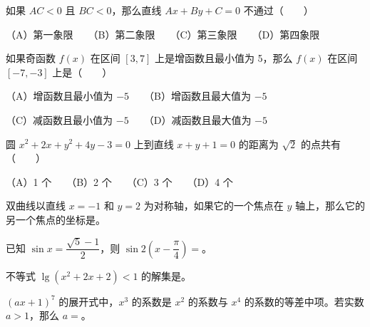 \begin{question}

如果 $AC<0$ 且 $BC<0$，那么直线 $Ax+By+C=0$ 不通过\mbox{（　　）}

（A）第一象限　　（B）第二象限　　（C）第三象限　　（D）第四象限

\end{question}
\begin{question}

如果奇函数 $f(x)$ 在区间 $[3,7]$ 上是增函数且最小值为 5，那么 $f(x)$ 在区间 $[-7,-3]$ 上是\mbox{（　　）}

（A）增函数且最小值为 $-5$　　（B）增函数且最大值为 $-5$

（C）减函数且最小值为 $-5$　　（D）减函数且最大值为 $-5$

\end{question}
\begin{question}

圆 $x^2+2x+y^2+4y-3=0$ 上到直线 $x+y+1=0$ 的距离为 $\sqrt2$ 的点共有\mbox{（　　）}

（A）1 个　　（B）2 个　　（C）3 个　　（D）4 个

\end{question}
\begin{question}

双曲线以直线 $x=-1$ 和 $y=2$ 为对称轴，如果它的一个焦点在 $y$ 轴上，那么它的另一个焦点的坐标是\underline{\hspace{7em}}。

\end{question}
\begin{question}

已知 $\sin x=\dfrac{\sqrt5-1}{2}$，则 $\sin 2\left(x-\dfrac\pi4\right)=$\underline{\hspace{6em}}。

\end{question}
\begin{question}

不等式 $\lg(x^2+2x+2)<1$ 的解集是\underline{\hspace{8em}}。

\end{question}
\begin{question}

$(ax+1)^7$ 的展开式中，$x^3$ 的系数是 $x^2$ 的系数与 $x^4$ 的系数的等差中项。若实数 $a>1$，那么 $a=$\underline{\hspace{6em}}。

\end{question}
